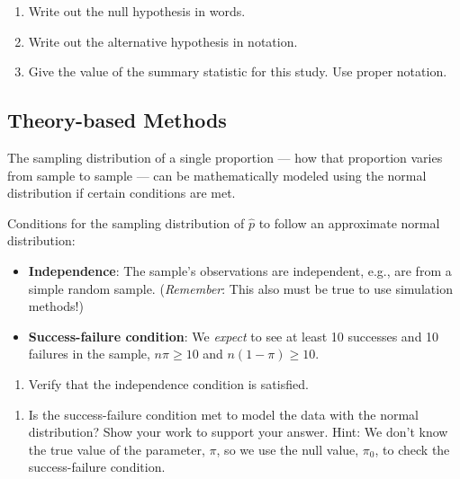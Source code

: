 \documentclass[
]{report}
\providecommand{\tightlist}{%
  \setlength{\itemsep}{0pt}\setlength{\parskip}{0pt}}
\begin{document}
\vspace{0.8in}

\begin{enumerate}
\def\labelenumi{\arabic{enumi}.}
\setcounter{enumi}{1}
\item
  Write out the null hypothesis in words.
  \vspace{0.8in}
\item
  Write out the alternative hypothesis in notation.
  \vspace{0.3in}
\item
  Give the value of the summary statistic for this study. Use proper notation.
\end{enumerate}

\vspace{0.3in}

\hypertarget{theory-based-methods}{%
\subsection*{Theory-based Methods}\label{theory-based-methods}}

The sampling distribution of a single proportion --- how that proportion varies from sample to sample --- can be mathematically modeled using the normal distribution if certain conditions are met.

Conditions for the sampling distribution of \(\hat{p}\) to follow an approximate normal distribution:

\begin{itemize}
\item
  \textbf{Independence}: The sample's observations are independent, e.g., are from a simple random sample. (\emph{Remember}: This also must be true to use simulation methods!)
\item
  \textbf{Success-failure condition}: We \emph{expect} to see at least 10 successes and 10 failures in the sample, \(n\pi≥10\) and \(n(1-\pi)≥10\).
\end{itemize}

\begin{enumerate}
\def\labelenumi{\arabic{enumi}.}
\setcounter{enumi}{4}
\tightlist
\item
  Verify that the independence condition is satisfied.
\end{enumerate}

\vspace{0.5in}

\begin{enumerate}
\def\labelenumi{\arabic{enumi}.}
\setcounter{enumi}{5}
\tightlist
\item
  Is the success-failure condition met to model the data with the normal distribution? Show your work to support your answer. Hint: We don't know the true value of the parameter, \(\pi\), so we use the null value, \(\pi_0\), to check the success-failure condition.
\end{enumerate}
\end{document}
